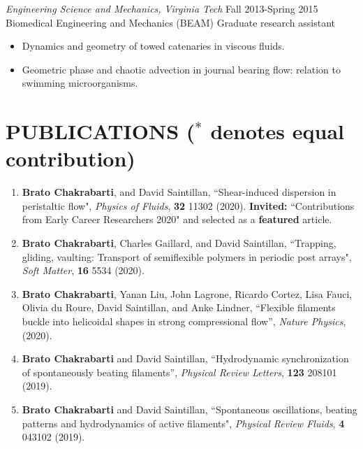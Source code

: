 \documentclass[10pt]{res} %
\begin{document}
\begin{resume}
{\sl Engineering Science and Mechanics, Virginia Tech} \hfill Fall 2013-Spring 2015\\[2pt]
Biomedical Engineering and Mechanics (BEAM) \hfill Graduate research assistant
\vspace*{2mm}
\begin{itemize} \itemsep -2pt %
\item Dynamics and geometry of towed catenaries in viscous fluids. 
\item Geometric phase and chaotic advection in journal bearing flow: relation to swimming microorganisms.
\end{itemize} 
 




\section{{PUBLICATIONS} {($^*$ denotes equal contribution)} }
\vspace*{6mm}
\begin{enumerate}
	\item \textbf{Brato Chakrabarti}, and David Saintillan, ``Shear-induced dispersion in peristaltic flow", \textit{Physics of Fluids}, \textbf{32} 11302 (2020).  \textbf{Invited:} ``Contributions from Early Career Researchers 2020" and selected as a \textbf{featured} article.
		
	\item \textbf{Brato Chakrabarti}, Charles Gaillard, and David Saintillan, ``Trapping, gliding, vaulting: Transport of semiflexible polymers in periodic post arrays", \textit{Soft Matter}, \textbf{16} 5534 (2020).
		
	
	\item \textbf{Brato Chakrabarti}, Yanan Liu, John Lagrone, Ricardo Cortez, Lisa Fauci, Olivia du Roure, David Saintillan, and Anke Lindner, ``Flexible filaments buckle into helicoidal shapes in strong compressional flow'',  \textit{Nature Physics}, (2020).
	
   \item \textbf{Brato Chakrabarti} and David Saintillan, ``Hydrodynamic synchronization of spontaneously beating filaments'', \textit{Physical Review Letters}, \textbf{123} 208101 (2019). 
 
   
	\item \textbf{Brato Chakrabarti} and David Saintillan, ``Spontaneous oscillations, beating patterns and hydrodynamics of active filaments", \textit{Physical Review Fluids}, \textbf{4} 043102 (2019). 
	

\end{enumerate}
\end{resume}
\end{document}
